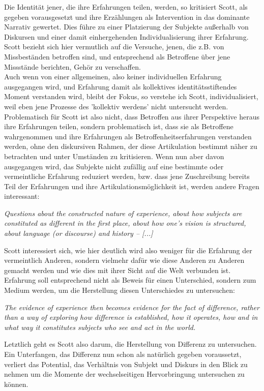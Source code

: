 \noindent Die Identität jener, die ihre Erfahrungen teilen, werden, so kritisiert Scott,
als gegeben vorausgesetzt und ihre Erzählungen als Intervention in das
dominante Narrativ gewertet. Dies führe zu einer Platzierung der Subjekte
außerhalb von Diskursen und einer damit einhergehenden Individualisierung ihrer
Erfahrung. Scott bezieht sich hier vermutlich auf die Versuche, jenen, die z.B.
von Missbeständen betroffen sind, und entsprechend als Betroffene über jene
Missstände berichten, Gehör zu verschaffen. \\
Auch wenn von einer allgemeinen,
also keiner individuellen Erfahrung ausgegangen wird, und Erfahrung damit als
kollektives identitätsstiftendes Moment verstanden wird, bleibt der Fokus, so
verstehe ich Scott, individualisiert, weil eben jene Prozesse des 'kollektiv
werdens' nicht untersucht werden.\\
Problematisch für Scott ist also nicht, dass
Betroffen aus ihrer Perspektive heraus ihre Erfahrungen teilen, sondern
problematisch ist, dass sie als Betroffene wahrgenommen und ihre Erfahrungen
als Betroffenheitserfahrungen verstanden werden, ohne den diskursiven Rahmen,
der diese Artikulation bestimmt näher zu betrachten und unter Umständen zu
kritisieren. Wenn nun aber davon ausgegangen wird, das Subjekte nicht zufällig
auf eine bestimmte oder vermeintliche Erfahrung reduziert werden, bzw. dass
jene Zuschreibung bereits Teil der Erfahrungen und ihre
Artikulationsmöglichkeit ist, werden andere Fragen interessant: 
\begin{myenv}
 \textit{\glqq Questions about the constructed nature of experience, about how
 subjects are constituted as different in the first place, about how one's
vision is structured, about language (or discourse) and history – [...]\grqq}
\footnotemark {}
\end{myenv}
Scott interessiert sich, wie hier deutlich wird also weniger für die Erfahrung
der vermeintlich Anderen, sondern vielmehr dafür wie diese Anderen zu Anderen
gemacht werden und wie dies mit ihrer Sicht auf die Welt verbunden ist.
Erfahrung soll entsprechend nicht als Beweis für einen Unterschied, sondern zum
Medium werden, um die Herstellung diesen Unterschiedes zu untersuchen:
\begin{myenv}
 \textit{\glqq 
  The evidence of experience then becomes evidence for the fact of difference, rather than a way of exploring how difference is established, how it operates, how and in what way it constitutes subjects who see and act in the world.\grqq}
\footnotemark {}
\end{myenv}
Letztlich geht es Scott also darum, die Herstellung von Differenz zu
untersuchen. Ein Unterfangen, das Differenz nun schon als natürlich gegeben
voraussetzt, verliert das Potential, das Verhältnis von Subjekt und Diskurs in
den Blick zu nehmen um die Momente der wechselseitigen Hervorbringung
untersuchen zu können. \\

